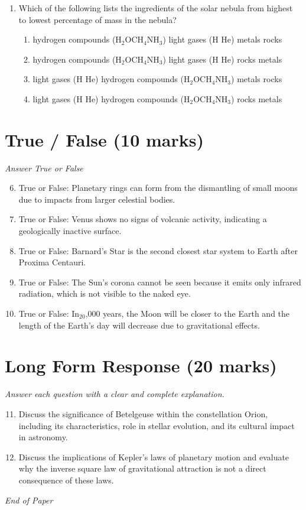 \documentclass[12pt]{article}
\begin{document}
\begin{enumerate}[label=\arabic*.]
\begin{enumerate}[label=(\alph*)]
    \item It would be harder since the truck is lighter on Mars.
    \item It would be the same no matter where you are.
\end{enumerate}
\item Which of the following lists the ingredients of the solar nebula from highest to lowest percentage of mass in the nebula?
\begin{enumerate}[label=(\alph*)]
    \item hydrogen compounds (H$_{2}$OCH$_{4}$NH$_{3}$) light gases (H He) metals rocks
    \item hydrogen compounds (H$_{2}$OCH$_{4}$NH$_{3}$) light gases (H He) rocks metals
    \item light gases (H He) hydrogen compounds (H$_{2}$OCH$_{4}$NH$_{3}$) metals rocks
    \item light gases (H He) hydrogen compounds (H$_{2}$OCH$_{4}$NH$_{3}$) rocks metals
\end{enumerate}
\end{enumerate}

\section*{True / False (10 marks)}
\textit{Answer True or False}
\begin{enumerate}[label=\arabic*.]
\setcounter{enumi}{5}
\item True or False: Planetary rings can form from the dismantling of small moons due to impacts from larger celestial bodies.
\item True or False: Venus shows no signs of volcanic activity, indicating a geologically inactive surface.
\item True or False: Barnard's Star is the second closest star system to Earth after Proxima Centauri.
\item True or False: The Sun's corona cannot be seen because it emits only infrared radiation, which is not visible to the naked eye.
\item True or False: In$_{20}$,000 years, the Moon will be closer to the Earth and the length of the Earth's day will decrease due to gravitational effects.
\end{enumerate}

\section*{Long Form Response (20 marks)}
\textit{Answer each question with a clear and complete explanation.}
\begin{enumerate}[label=\arabic*.]
\setcounter{enumi}{10}
\item Discuss the significance of Betelgeuse within the constellation Orion, including its characteristics, role in stellar evolution, and its cultural impact in astronomy.
\item Discuss the implications of Kepler's laws of planetary motion and evaluate why the inverse square law of gravitational attraction is not a direct consequence of these laws.
\end{enumerate}

\vfill
\noindent\textit{End of Paper}
\end{document}
